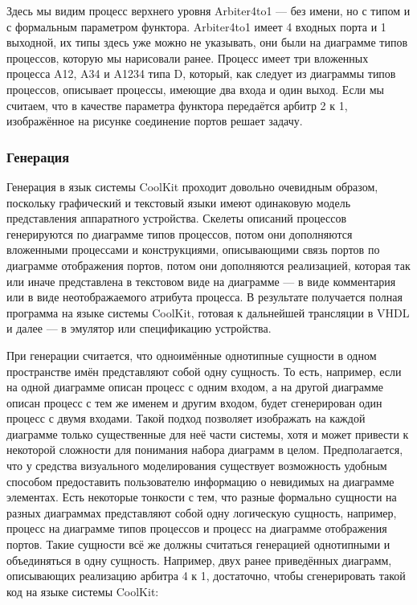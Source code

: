 Здесь мы видим процесс верхнего уровня Arbiter4to1 --- без имени, но с типом и с формальным 
параметром функтора. Arbiter4to1 имеет 4 входных порта и 1 выходной, их типы здесь 
уже можно не указывать, они были на диаграмме типов процессов, которую мы нарисовали 
ранее. Процесс имеет три вложенных процесса A12, A34 и A1234 типа D, который, как 
следует из диаграммы типов процессов, описывает процессы, имеющие два входа и один 
выход. Если мы считаем, что в качестве параметра функтора передаётся арбитр 2 к 1, 
изображённое на рисунке соединение портов решает задачу.

\subsubsection{Генерация}
Генерация в язык системы CoolKit проходит довольно очевидным образом, поскольку графический 
и текстовый языки имеют одинаковую модель представления аппаратного устройства. Скелеты 
описаний процессов генерируются по диаграмме типов процессов, потом они дополняются 
вложенными процессами и конструкциями, описывающими связь портов по диаграмме отображения 
портов, потом они дополняются реализацией, которая так или иначе представлена в текстовом 
виде на диаграмме --- в виде комментария или в виде неотображаемого атрибута процесса. 
В результате получается полная программа на языке системы CoolKit, готовая к дальнейшей 
трансляции в VHDL и далее --- в эмулятор или спецификацию устройства.

При генерации считается, что одноимённые однотипные сущности в одном пространстве 
имён представляют собой одну сущность. То есть, например, если на одной диаграмме 
описан процесс с одним входом, а на другой диаграмме описан процесс с тем же именем 
и другим входом, будет сгенерирован один процесс с двумя входами. Такой подход позволяет 
изображать на каждой диаграмме только существенные для неё части системы, хотя и может 
привести к некоторой сложности для понимания набора диаграмм в целом. Предполагается, 
что у средства визуального моделирования существует возможность удобным способом предоставить 
пользователю информацию о невидимых на диаграмме элементах. Есть некоторые тонкости 
с тем, что разные формально сущности на разных диаграммах представляют собой одну 
логическую сущность, например, процесс на диаграмме типов процессов и процесс на диаграмме 
отображения портов. Такие сущности всё же должны считаться генерацией однотипными и 
объединяться в одну сущность. Например, двух ранее приведённых диаграмм, описывающих 
реализацию арбитра 4 к 1, достаточно, чтобы сгенерировать такой код на языке системы CoolKit:

